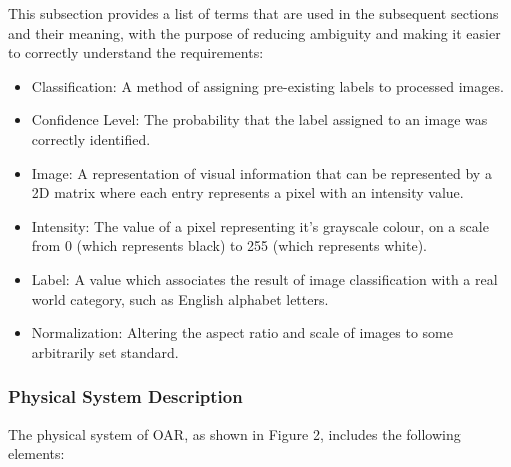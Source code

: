 \documentclass[12pt]{article}
\begin{document}
This subsection provides a list of terms that are used in the subsequent
sections and their meaning, with the purpose of reducing ambiguity and making it
easier to correctly understand the requirements:

\begin{itemize}

\item Classification: A method of assigning pre-existing labels to processed images.
\item Confidence Level: The probability that the label assigned to an image was correctly identified.
\item Image: A representation of visual information that can be represented by a 2D matrix where each entry represents a pixel with an intensity value.
\item Intensity: The value of a pixel representing it's grayscale colour, on a scale from 0 (which represents black) to 255 (which represents white).
\item Label: A value which associates the result of image classification with a real world category, such as English alphabet letters.
\item Normalization: Altering the aspect ratio and scale of images to some arbitrarily set standard.


\end{itemize}

\subsubsection{Physical System Description} \label{sec_phySystDescrip}

The physical system of OAR, as shown in Figure 2,
includes the following elements:
\end{document}

